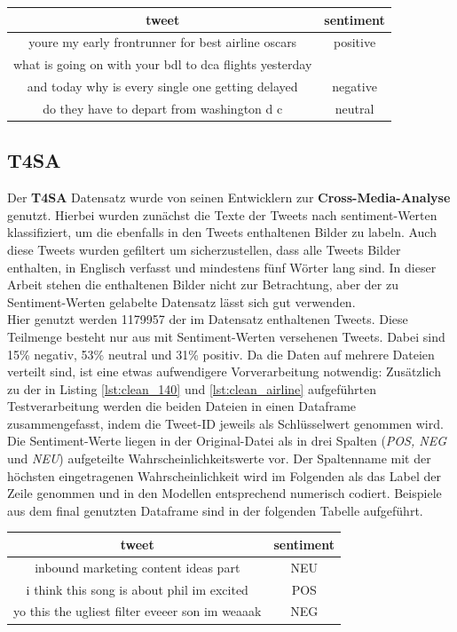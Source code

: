 \begin{center}
\begin{tabular}{|c|c|}
\hline
tweet & sentiment\\ 
\hline\hline
youre my early frontrunner for best airline  oscars&positive\\
\hline
what is going on with your bdl to dca flights yesterday&\\ and today   why is every single one getting delayed&negative\\
\hline
do they have to depart from washington  d  c&neutral\\
\hline    
\end{tabular}
\end{center}

\subsection{T4SA}
\label{sec:t4sa}
Der \textbf{T4SA} Datensatz \cite{t4sa} wurde von seinen Entwicklern zur \textbf{Cross-Media-Analyse} genutzt. Hierbei wurden zun\"achst die Texte der Tweets nach sentiment-Werten klassifiziert, um die ebenfalls in den Tweets enthaltenen Bilder zu labeln. Auch diese Tweets wurden gefiltert um sicherzustellen, dass alle Tweets Bilder enthalten, in Englisch verfasst und mindestens f\"unf W\"orter lang sind. In dieser Arbeit stehen die enthaltenen Bilder nicht zur Betrachtung, aber der zu Sentiment-Werten gelabelte Datensatz l\"asst sich gut verwenden.\\
Hier genutzt werden 1179957 der im Datensatz enthaltenen Tweets. Diese Teilmenge besteht nur aus mit Sentiment-Werten versehenen Tweets. Dabei sind 15\% negativ, 53\% neutral und 31\% positiv. Da die Daten auf mehrere Dateien verteilt sind, ist eine etwas aufwendigere Vorverarbeitung notwendig: Zus\"atzlich zu der in Listing \ref{lst:clean_140} und \ref{lst:clean_airline} aufgef\"uhrten Testverarbeitung werden die beiden Dateien in einen Dataframe zusammengefasst, indem die Tweet-ID jeweils als Schl\"usselwert genommen wird. Die Sentiment-Werte liegen in der Original-Datei als in drei Spalten (\textit{POS, NEG} und \textit{NEU}) aufgeteilte Wahrscheinlichkeitswerte vor. Der Spaltenname mit der h\"ochsten eingetragenen Wahrscheinlichkeit wird im Folgenden als das Label der Zeile genommen und in den Modellen entsprechend numerisch codiert. Beispiele aus dem final genutzten Dataframe sind in der folgenden Tabelle aufgef\"uhrt.
\begin{center}
\begin{tabular}{|c|c|}
\hline
tweet & sentiment\\ 
\hline\hline
inbound marketing content ideas part&NEU\\
\hline
i think this song is about phil im excited&POS\\
\hline
yo this the ugliest filter eveeer son  im weaaak&NEG\\
\hline    
\end{tabular}
\end{center}


